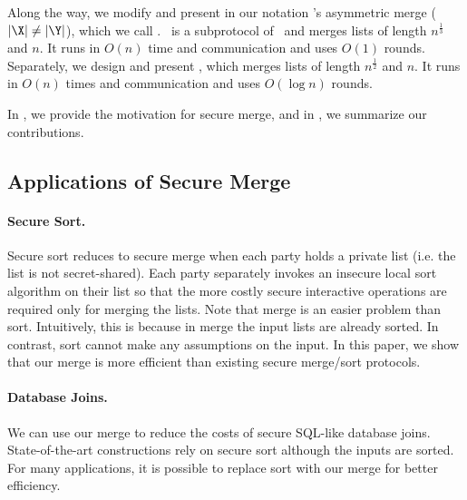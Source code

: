 Along the way, we modify and present in our notation \cite{EPRINT:BBDLO22}'s asymmetric merge ($|\X| \neq |\Y|$), which we call \knmerge. \knmerge\ is a subprotocol of \ourapproachtwo\ and merges lists of length $n^{\frac{1}{3}}$ and $n$. It runs in $O(n)$ time and communication and uses $O(1)$ rounds. 
Separately, we design and present \sqrtmerge, which merges lists of length $n^{\frac{1}{2}}$ and $n$. It runs in $O(n)$ times and communication and uses $O(\log n)$ rounds. 

In , we provide the motivation for secure merge, and in , we summarize our contributions.

\subsection{Applications of Secure Merge}\label{sec:motivation}

\paragraph{Secure Sort.}
Secure sort reduces to secure merge when each party holds a private list (i.e. the list is not secret-shared).
Each party separately invokes an insecure local sort algorithm on their list so that the more costly secure interactive operations are required only for merging the lists. 
Note that merge is an easier problem than sort. Intuitively, this is because in merge the input lists are already sorted.
In contrast, sort cannot make any assumptions on the input. In this paper, we show that our merge is more efficient than existing secure merge/sort protocols.

\paragraph{Database Joins.}

We can use our merge to reduce the costs of secure SQL-like database joins. State-of-the-art constructions \cite{CCS:BDGRR22,CCS:AHKNPT23} rely on secure sort although the inputs are sorted. For many applications, it is possible to replace sort with our merge for better efficiency.


